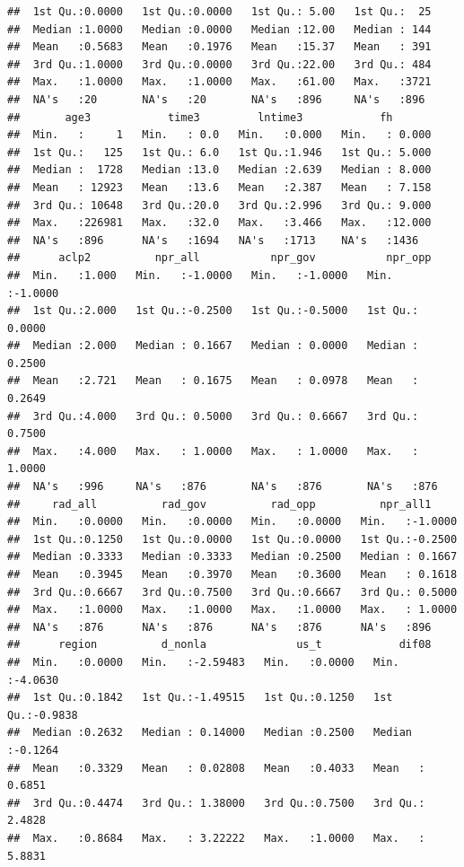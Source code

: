 \documentclass[]{book}
\begin{document}
\begin{verbatim}
##  1st Qu.:0.0000   1st Qu.:0.0000   1st Qu.: 5.00   1st Qu.:  25  
##  Median :1.0000   Median :0.0000   Median :12.00   Median : 144  
##  Mean   :0.5683   Mean   :0.1976   Mean   :15.37   Mean   : 391  
##  3rd Qu.:1.0000   3rd Qu.:0.0000   3rd Qu.:22.00   3rd Qu.: 484  
##  Max.   :1.0000   Max.   :1.0000   Max.   :61.00   Max.   :3721  
##  NA's   :20       NA's   :20       NA's   :896     NA's   :896   
##       age3            time3         lntime3            fh        
##  Min.   :     1   Min.   : 0.0   Min.   :0.000   Min.   : 0.000  
##  1st Qu.:   125   1st Qu.: 6.0   1st Qu.:1.946   1st Qu.: 5.000  
##  Median :  1728   Median :13.0   Median :2.639   Median : 8.000  
##  Mean   : 12923   Mean   :13.6   Mean   :2.387   Mean   : 7.158  
##  3rd Qu.: 10648   3rd Qu.:20.0   3rd Qu.:2.996   3rd Qu.: 9.000  
##  Max.   :226981   Max.   :32.0   Max.   :3.466   Max.   :12.000  
##  NA's   :896      NA's   :1694   NA's   :1713    NA's   :1436    
##      aclp2          npr_all           npr_gov           npr_opp       
##  Min.   :1.000   Min.   :-1.0000   Min.   :-1.0000   Min.   :-1.0000  
##  1st Qu.:2.000   1st Qu.:-0.2500   1st Qu.:-0.5000   1st Qu.: 0.0000  
##  Median :2.000   Median : 0.1667   Median : 0.0000   Median : 0.2500  
##  Mean   :2.721   Mean   : 0.1675   Mean   : 0.0978   Mean   : 0.2649  
##  3rd Qu.:4.000   3rd Qu.: 0.5000   3rd Qu.: 0.6667   3rd Qu.: 0.7500  
##  Max.   :4.000   Max.   : 1.0000   Max.   : 1.0000   Max.   : 1.0000  
##  NA's   :996     NA's   :876       NA's   :876       NA's   :876      
##     rad_all          rad_gov          rad_opp          npr_all1      
##  Min.   :0.0000   Min.   :0.0000   Min.   :0.0000   Min.   :-1.0000  
##  1st Qu.:0.1250   1st Qu.:0.0000   1st Qu.:0.0000   1st Qu.:-0.2500  
##  Median :0.3333   Median :0.3333   Median :0.2500   Median : 0.1667  
##  Mean   :0.3945   Mean   :0.3970   Mean   :0.3600   Mean   : 0.1618  
##  3rd Qu.:0.6667   3rd Qu.:0.7500   3rd Qu.:0.6667   3rd Qu.: 0.5000  
##  Max.   :1.0000   Max.   :1.0000   Max.   :1.0000   Max.   : 1.0000  
##  NA's   :876      NA's   :876      NA's   :876      NA's   :896      
##      region          d_nonla              us_t            dif08        
##  Min.   :0.0000   Min.   :-2.59483   Min.   :0.0000   Min.   :-4.0630  
##  1st Qu.:0.1842   1st Qu.:-1.49515   1st Qu.:0.1250   1st Qu.:-0.9838  
##  Median :0.2632   Median : 0.14000   Median :0.2500   Median :-0.1264  
##  Mean   :0.3329   Mean   : 0.02808   Mean   :0.4033   Mean   : 0.6851  
##  3rd Qu.:0.4474   3rd Qu.: 1.38000   3rd Qu.:0.7500   3rd Qu.: 2.4828  
##  Max.   :0.8684   Max.   : 3.22222   Max.   :1.0000   Max.   : 5.8831  

\end{verbatim}
\end{document}
